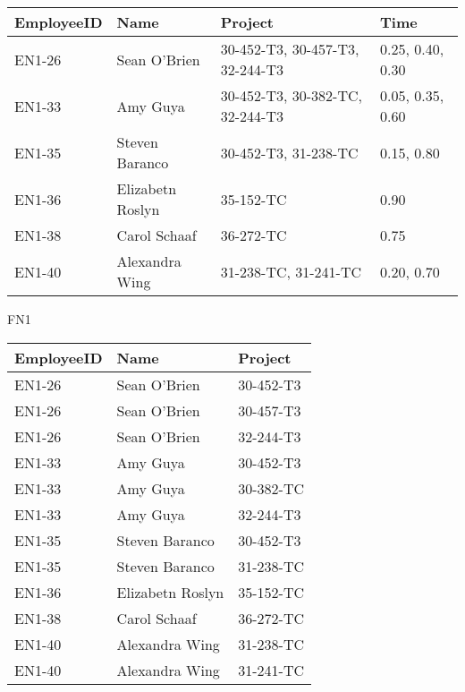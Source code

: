 \documentclass{article}
\begin{document}
\begin{tabular}{|p{0.6in}|p{0.9in}|p{1.6in}|p{1.1in}|} \hline 
EmployeeID & Name & Project & Time \\ \hline 
EN1-26 & Sean O'Brien & 30-452-T3, 30-457-T3, 32-244-T3 & 0.25, 0.40, 0.30 \\ \hline 
EN1-33 & Amy Guya & 30-452-T3, 30-382-TC, 32-244-T3 & 0.05, 0.35, 0.60 \\ \hline 
EN1-35 & Steven Baranco & 30-452-T3, 31-238-TC & 0.15, 0.80 \\ \hline 
EN1-36 & Elizabetn Roslyn & 35-152-TC & 0.90 \\ \hline 
EN1-38 & Carol Schaaf & 36-272-TC & 0.75 \\ \hline 
EN1-40 & Alexandra Wing & 31-238-TC, 31-241-TC & 0.20, 0.70 \\ \hline 
\end{tabular}



\noindent FN1

\begin{tabular}{|p{0.6in}|p{0.7in}|p{0.6in}|} \hline 
EmployeeID & Name & Project \\ \hline 
EN1-26 & Sean O'Brien & 30-452-T3 \\ \hline 
EN1-26 & Sean O'Brien & 30-457-T3 \\ \hline 
EN1-26 & Sean O'Brien & 32-244-T3 \\ \hline 
EN1-33 & Amy Guya & 30-452-T3 \\ \hline 
EN1-33 & Amy Guya & 30-382-TC \\ \hline 
EN1-33 & Amy Guya & 32-244-T3 \\ \hline 
EN1-35 & Steven Baranco & 30-452-T3 \\ \hline 
EN1-35 & Steven Baranco & 31-238-TC \\ \hline 
EN1-36 & Elizabetn Roslyn & 35-152-TC \\ \hline 
EN1-38 & Carol Schaaf & 36-272-TC \\ \hline 
EN1-40 & Alexandra Wing & 31-238-TC \\ \hline 
EN1-40 & Alexandra Wing & 31-241-TC \\ \hline 
\end{tabular}
\end{document}

